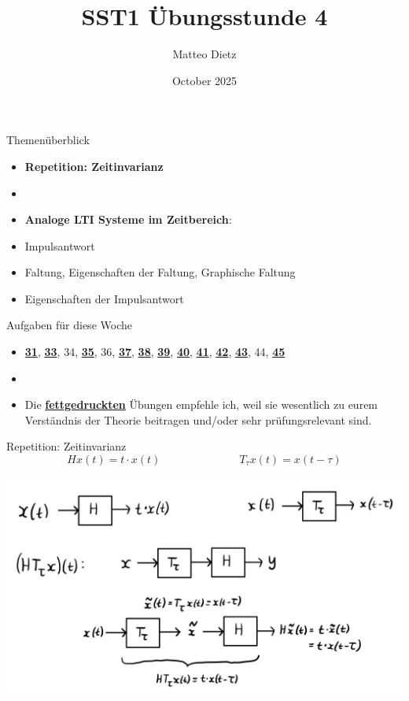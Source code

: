 \documentclass[14pt, aspectratio=169, handout]{beamer}
\title{SST1 Übungsstunde 4}
\author{Matteo Dietz}
\date{October 2025}
\begin{document}
\maketitle

\begin{frame}{Themenüberblick}
    \begin{itemize}
        \item \textbf{Repetition: Zeitinvarianz}
        \item[] 
        \item \textbf{Analoge LTI Systeme im Zeitbereich}:
        \item[] Impulsantwort
        \item[] Faltung, Eigenschaften der Faltung, Graphische Faltung
        \item[] Eigenschaften der Impulsantwort
    \end{itemize}
\end{frame}

\begin{frame}{Aufgaben für diese Woche}
    \begin{itemize}
        \item[] \underline{\textbf{31}}, \underline{\textbf{33}}, 34, \underline{\textbf{35}}, 36, \underline{\textbf{37}}, \underline{\textbf{38}}, \underline{\textbf{39}}, \underline{\textbf{40}}, \underline{\textbf{41}}, \underline{\textbf{42}}, \underline{\textbf{43}}, 44, \underline{\textbf{45}}
        \item[] 
        \item[] Die \underline{\textbf{fettgedruckten}} Übungen empfehle ich, weil sie wesentlich zu eurem Verständnis der Theorie beitragen und/oder sehr prüfungsrelevant sind.
    \end{itemize}
\end{frame}

\begin{frame}{Repetition: Zeitinvarianz}
    $$Hx(t) = t \cdot x(t) \hspace{3cm} T_\tau x(t) = x(t-\tau)$$
    \vspace*{-0.75cm}
    \begin{center}
        \includegraphics[width=0.8\linewidth]{figures/Zeitverschiebung.jpg}
    \end{center}
\end{frame}
\end{document}
